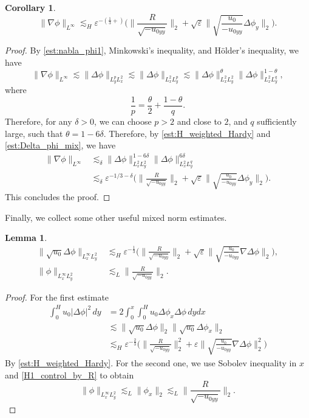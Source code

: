 \documentclass[reqno, 11pt]{amsart}
\theoremstyle{plain}
\newtheorem{lemma}[theorem]{Lemma}
\newtheorem{corollary}[theorem]{Corollary}
\theoremstyle{definition}
\theoremstyle{remark}
\numberwithin{equation}{section}
\begin{document}
\begin{corollary}
\begin{equation}\label{est:nabla_phi_L_infty}
\| \nabla \phi\|_{L^\infty} \lesssim_H \varepsilon^{-(\frac{1}{3}+)} \Big( \|\frac{R}{\sqrt{-u_{0yy}}}\|_2 + \sqrt{\varepsilon} \| \sqrt{\frac{u_0}{-u_{0yy}}} \Delta \phi_y\|_2\Big).
\end{equation}
\end{corollary}
\begin{proof}
By \eqref{est:nabla_phi1}, Minkowski's inequality, and H\"older's inequality, we have
$$
\| \nabla \phi\|_{L^\infty} \lesssim \| \Delta \phi\|_{L^p_yL^2_x} \lesssim \| \Delta \phi\|_{L^2_xL^p_y} \lesssim \|\Delta \phi\|_{L^2_xL^2_y}^\theta \|\Delta \phi\|_{L^2_xL^q_y}^{1-\theta},
$$
where
$$
\frac{1}{p} = \frac{\theta}{2} + \frac{1-\theta}{q}.
$$
Therefore, for any $\delta > 0$, we can choose $p>2$ and close to $2$, and $q$ sufficiently large, such that
$\theta = 1-6\delta$. Therefore, by \eqref{est:H_weighted_Hardy} and \eqref{est:Delta_phi_mix}, we have
\begin{align*}
\|\nabla \phi\|_{L^\infty} &\lesssim_\delta \|\Delta \phi\|_{L^2_xL^2_y}^{1-6\delta} \|\Delta \phi\|_{L^2_xL^q_y}^{6\delta}\\
&\lesssim_\delta \varepsilon^{-1/3 - \delta} \Big( \|\frac{R}{\sqrt{-u_{0yy}}}\|_2 + \sqrt{\varepsilon} \| \sqrt{\frac{u_0}{-u_{0yy}}} \Delta \phi_y\|_2\Big).
\end{align*}
This concludes the proof.
\end{proof}

Finally, we collect some other useful mixed norm estimates.

\begin{lemma}
\begin{equation}\label{est:mix_norm_misc}
\begin{aligned}
\| \sqrt{u_0} \Delta \phi\|_{L^\infty_x L^2_y} &\lesssim_{H} \varepsilon^{-\frac{1}{3}} \Big( \|\frac{R}{\sqrt{-u_{0yy}}}\|_2 + \sqrt{\varepsilon} \| \sqrt{\frac{u_0}{-u_{0yy}}} \nabla \Delta \phi\|_2\Big),\\
\|\phi\|_{L^\infty_xL^2_y} &\lesssim_{L}  \|\frac{R}{\sqrt{-u_{0yy}}}\|_2.
\end{aligned}
\end{equation}
\end{lemma}

\begin{proof}For the first estimate
\begin{align*}
\int_0^H u_0| \Delta \phi|^2 \, dy &= 2 \int_0^x \int_0^H u_0 \Delta \phi_x \Delta \phi \, dy dx\\
&\lesssim \|\sqrt{u_0} \Delta \phi\|_2 \| \sqrt{u_0} \Delta \phi_{x}\|_2\\
&\lesssim_{H} \varepsilon^{-\frac{2}{3}} \Big( \|\frac{R}{\sqrt{-u_{0yy}}}\|_2^2 + \varepsilon \| \sqrt{\frac{u_0}{-u_{0yy}}} \nabla \Delta \phi\|_2^2\Big)
\end{align*}
By \eqref{est:H_weighted_Hardy}. For the second one, we use Sobolev inequality in $x$ and \eqref{H1_control_by_R} to obtain
$$
\|\phi\|_{L^\infty_xL^2_y} \lesssim_{L} \|\phi_x\|_2 \lesssim_{L}  \|\frac{R}{\sqrt{-u_{0yy}}}\|_2.
$$
\end{proof}
\end{document}
